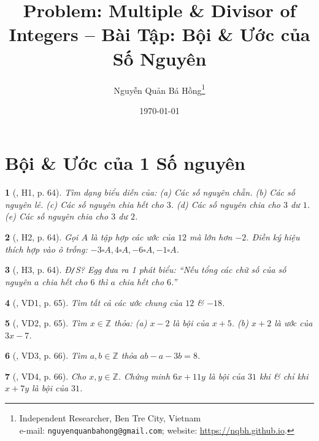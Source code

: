 \documentclass{article}
\title{Problem: Multiple \& Divisor of Integers -- Bài Tập: Bội \& Ước của Số Nguyên}
\author{Nguyễn Quản Bá Hồng\footnote{Independent Researcher, Ben Tre City, Vietnam\\e-mail: \texttt{nguyenquanbahong@gmail.com}; website: \url{https://nqbh.github.io}.}}
\date{\today}
\newtheorem{baitoan}{}
\begin{document}
\maketitle
\tableofcontents


\section{Bội \& Ước của 1 Số nguyên}

\begin{baitoan}[\cite{Binh_boi_duong_Toan_6_tap_1}, H1, p. 64]
	Tìm dạng biểu diễn của: (a) Các số nguyên chẵn. (b) Các số nguyên lẻ. (c) Các số nguyên chia hết cho $3$. (d) Các số nguyên chia cho $3$ dư $1$. (e) Các số nguyên chia cho $3$ dư $2$.
\end{baitoan}

\begin{baitoan}[\cite{Binh_boi_duong_Toan_6_tap_1}, H2, p. 64]
	Gọi $A$ là tập hợp các ước của $12$ mà lớn hơn $-2$. Điền ký hiệu thích hợp vào ô trống: $-3\square A,4\square A,-6\square A,-1\square A$.
\end{baitoan}

\begin{baitoan}[\cite{Binh_boi_duong_Toan_6_tap_1}, H3, p. 64]
	{\rm Đ{\tt/}S?} Egg đưa ra 1 phát biểu: ``Nếu tổng các chữ số của số nguyên $a$ chia hết cho $6$ thì $a$ chia hết cho $6$.''
\end{baitoan}

\begin{baitoan}[\cite{Binh_boi_duong_Toan_6_tap_1}, VD1, p. 65]
	Tìm tất cả các ước chung của $12$ \& $-18$.
\end{baitoan}

\begin{baitoan}[\cite{Binh_boi_duong_Toan_6_tap_1}, VD2, p. 65]
	Tìm $x\in\mathbb{Z}$ thỏa: (a) $x - 2$ là bội của $x + 5$. (b) $x + 2$ là ước của $3x - 7$.
\end{baitoan}

\begin{baitoan}[\cite{Binh_boi_duong_Toan_6_tap_1}, VD3, p. 66]
	Tìm $a,b\in\mathbb{Z}$ thỏa $ab - a - 3b = 8$.
\end{baitoan}

\begin{baitoan}[\cite{Binh_boi_duong_Toan_6_tap_1}, VD4, p. 66]
	Cho $x,y\in\mathbb{Z}$. Chứng minh $6x + 11y$ là bội của $31$ khi \& chỉ khi $x + 7y$ là bội của $31$.
\end{baitoan}
\end{document}
